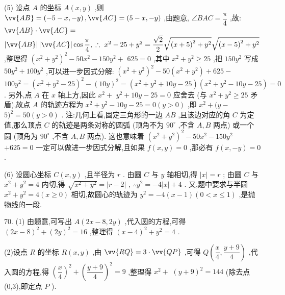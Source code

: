 (5) 设点 $A$ 的坐标 $A\left( {x,y}\right)$ ,则 $\vv{AB} = \left( {-5 - x, - y}\right) ,\vv{AC} = \left( {5 - x, - y}\right)$ ,由题意, $\angle {BAC} = \dfrac{\pi }{4}$ ,故: $\vv{AB} \cdot  \vv{AC} =$  $\left| \vv{AB}\right| \left| \vv{AC}\right| \cos \dfrac{\pi }{4},\;\therefore \;{x}^{2} - {25} + {y}^{2} = \dfrac{\sqrt{2}}{2}\sqrt{{\left( x + 5\right) }^{2} + {y}^{2}}\sqrt{{\left( x - 5\right) }^{2} + {y}^{2}}$ ,整理得 ${\left( {x}^{2} + {y}^{2}\right) }^{2} - {50}{x}^{2} - {150}{y}^{2} +$  ${625} = 0$ ,其中 ${x}^{2} + {y}^{2} \geq  {25}$ ,把 ${150}{y}^{2}$ 写成 ${50}{y}^{2} + {100}{y}^{2}$ ,可以进一步因式分解: ${\left( {x}^{2} + {y}^{2}\right) }^{2} - {50}\left( {{x}^{2} + {y}^{2}}\right)  + {625} -$  ${100}{y}^{2} = {\left( {x}^{2} + {y}^{2} - {25}\right) }^{2} - {\left( {10}y\right) }^{2} = \left( {{x}^{2} + {y}^{2} + {10y} - {25}}\right) \left( {{x}^{2} + {y}^{2} - {10y} - {25}}\right)  = 0$ . 另外,点 $A$ 在 $x$ 轴上方,因此 ${x}^{2} +$  ${y}^{2} + {10y} - {25} = 0$ 应舍去 (与 ${x}^{2} + {y}^{2} \geq  {25}$ 矛盾),故点 $A$ 的轨迹方程为 ${x}^{2} + {y}^{2} - {10y} - {25} = 0\left( {y > 0}\right)$ ,即 ${x}^{2} + (y -$  $5{)}^{2} = {50}\left( {y > 0}\right)$ . 注:几何上看,固定三角形的一边 ${AB}$ ,且该边对应的角 $C$ 为定值,那么顶点 $C$ 的轨迹是两条对称的圆弧 (顶角不为 ${90}^{ \circ  }$ ,不含 $A,B$ 两点) 或一个圆 (顶角为 ${90}^{ \circ  }$ ,不含 $A,B$ 两点). 这也意味着 ${\left( {x}^{2} + {y}^{2}\right) }^{2} - {50}{x}^{2} - {150}{y}^{2}$  $+ {625} = 0$ 一定可以做进一步因式分解,且如果 $f\left( {x,y}\right)  = 0$ ,那必有 $f\left( {x, - y}\right)  = 0$ .

(6) 设圆心坐标 $C\left( {x,y}\right)$ ,且半径为 $r$ . 由圆 $C$ 与 $y$ 轴相切,得 $\left| x\right|  = r$ ; 由圆 $C$ 与 ${x}^{2} + {y}^{2} = 4$ 内切,得 $\sqrt{{x}^{2} + {y}^{2}} = \left| {r - 2}\right|$ , $\therefore {y}^{2} =  - 4\left| x\right|  + 4$ . 又,题中要求与半圆 ${x}^{2} + {y}^{2} = 4\left( {x \geq  0}\right)$ 相切,故圆心的轨迹为 ${y}^{2} =  - 4\left( {x - 1}\right) \left( {0 < x \leq  1}\right)$ ,是抛物线的一段.

70. (1) 由题意,可写出 $A\left( {{2x} - 8,{2y}}\right)$ ,代入圆的方程,可得 ${\left( 2x - 8\right) }^{2} + {\left( 2y\right) }^{2} = {16}$ ,整理得 ${\left( x - 4\right) }^{2} + {y}^{2} = 4$ .

(2)设点 $R$ 的坐标 $R\left( {x,y}\right)$ ,由 $\vv{RQ} = 3 \cdot  \vv{QP}$ ,可得 $Q\left( {\dfrac{x}{4},\dfrac{y + 9}{4}}\right)$ ,代入圆的方程,得 ${\left( \dfrac{x}{4}\right) }^{2} + {\left( \dfrac{y + 9}{4}\right) }^{2} = 9$ ,整理得 ${x}^{2} +$  ${\left( y + 9\right) }^{2} = {144}$ (除去点(0,3),即定点 $P$ ).

